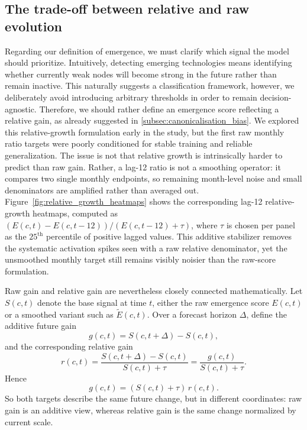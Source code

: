 \documentclass{article}
\begin{document}
\subsection{The trade-off between relative and raw evolution}
Regarding our definition of emergence, we must clarify which signal the model should prioritize. Intuitively, detecting emerging technologies means identifying whether currently weak nodes will become strong in the future rather than remain inactive. This naturally suggests a classification framework, however, we deliberately avoid introducing arbitrary thresholds in order to remain decision-agnostic. Therefore, we should rather define an emergence score reflecting a relative gain, as already suggested in \ref{subsec:canonicalisation_bias}. We explored this relative-growth formulation early in the study, but the first raw monthly ratio targets were poorly conditioned for stable training and reliable generalization. The issue is not that relative growth is intrinsically harder to predict than raw gain. Rather, a lag-12 ratio is not a smoothing operator: it compares two single monthly endpoints, so remaining month-level noise and small denominators are amplified rather than averaged out. Figure~\ref{fig:relative_growth_heatmaps} shows the corresponding lag-12 relative-growth heatmaps, computed as \((E(c,t)-E(c,t-12))/(E(c,t-12)+\tau)\), where \(\tau\) is chosen per panel as the \(25^{\text{th}}\) percentile of positive lagged values. This additive stabilizer removes the systematic activation spikes seen with a raw relative denominator, yet the unsmoothed monthly target still remains visibly noisier than the raw-score formulation.

Raw gain and relative gain are nevertheless closely connected mathematically. Let \(S(c,t)\) denote the base signal at time \(t\), either the raw emergence score \(E(c,t)\) or a smoothed variant such as \(\tilde{E}(c,t)\). Over a forecast horizon \(\Delta\), define the additive future gain
\[
g(c,t)=S(c,t+\Delta)-S(c,t),
\]
and the corresponding relative gain
\[
r(c,t)=\frac{S(c,t+\Delta)-S(c,t)}{S(c,t)+\tau}
=\frac{g(c,t)}{S(c,t)+\tau}.
\]
Hence
\[
g(c,t)=(S(c,t)+\tau)\,r(c,t).
\]
So both targets describe the same future change, but in different coordinates: raw gain is an additive view, whereas relative gain is the same change normalized by current scale.
\end{document}
